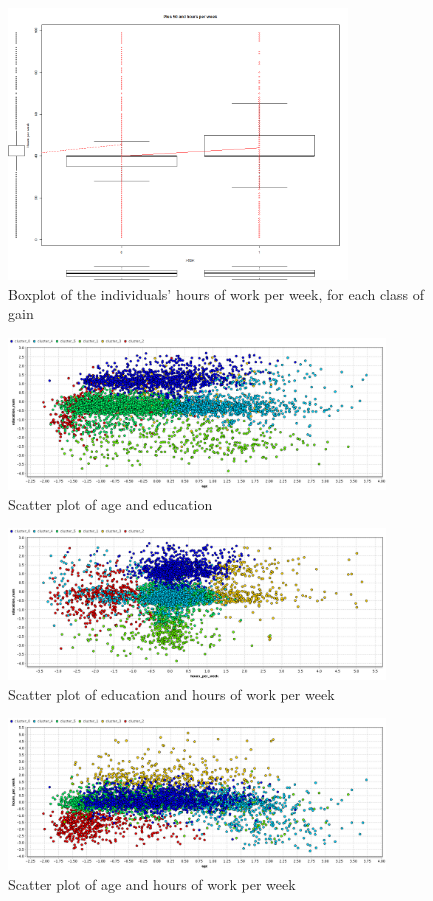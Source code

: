 \documentclass[a4paper]{llncs}
\begin{document}
\begin{figure}
\centering
\includegraphics[width=9cm]{plot_plus_50_hpw.png}
\caption{Boxplot of the individuals' hours of work per week, for each class of 
gain}
\label{fig:hpw_plus50}
\end{figure}

\begin{figure}
\centering
\includegraphics[width=10cm]{cluster_1_age_education.png}
\caption{Scatter plot of age and education}
\label{fig:cluster_1_age_education}
\end{figure}

\begin{figure}
\centering
\includegraphics[width=10cm]{cluster_1_education_hpw.png}
\caption{Scatter plot of education and hours of work per week}
\label{fig:cluster_1_education_hpw}
\end{figure}

\begin{figure}
\centering
\includegraphics[width=10cm]{cluster_1_age_hpw.png}
\caption{Scatter plot of age and hours of work per week}
\label{fig:cluster_1_age_hpw}
\end{figure}
\end{document}
